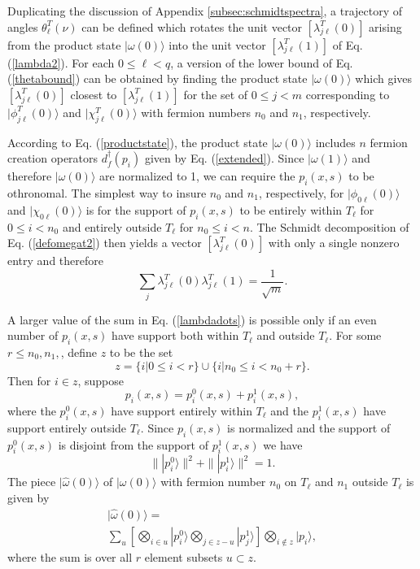 \documentclass[twocolumn,amsmath,amssymb]{revtex4-1}
\begin{document}
Duplicating the discussion of Appendix \ref{subsec:schmidtspectra}, a
trajectory of angles $\theta^T_\ell(\nu)$ can be defined which rotates
the unit vector $[ \lambda^T_{j\ell}(0) ]$ arising from the product
state $|\omega(0) \rangle $ into the unit vector $[\lambda^T_{j\ell}(1) ]$ of
Eq. (\ref{lambda2}). For each $0 \le \ell < q$, a version of
the lower bound of Eq. (\ref{thetabound}) can be obtained
by finding the product state $|\omega(0) \rangle $ which gives $[ \lambda^T_{j\ell}(0) ]$ 
closest to $[ \lambda^T_{j\ell}(1) ]$
for the set of $0 \le j < m$
corresponding to $|\phi^T_{j\ell}(0) \rangle $
and $|\chi^T_{j\ell}(0) \rangle $
with
fermion numbers $n_0$ and $n_1$, respectively.

According to Eq. (\ref{productstate}), the product state $|\omega(0) \rangle $ 
includes $n$ fermion creation operators
$ d^\dagger_f( p_i)$ given by
Eq. (\ref{extended}). Since $|\omega(1) \rangle $ and therefore $|\omega(0) \rangle $ are normalized
to 1, we can require the $p_i( x, s)$ 
to be othronomal.
The simplest way to insure $n_0$ and $n_1$, respectively,
for $|\phi_{0\ell}(0) \rangle $
and $|\chi_{0\ell}(0) \rangle $ is for the support of $p_i( x, s)$
to
be entirely within $T_\ell$ for $0 \le i < n_0$ and entirely
outside $T_\ell$ for $n_0 \le i < n$.
The Schmidt decomposition of Eq. (\ref{defomegat2}) then yields
a vector $[ \lambda^T_{j\ell}(0) ]$ with only a single nonzero
entry and therefore
\begin{equation}
  \label{lambdadots}
  \sum_j \lambda^T_{j \ell}(0) \lambda^T_{j \ell}(1) = \frac{1}{\sqrt{m}}.
\end{equation}


A larger value of the sum in Eq. (\ref{lambdadots}) is possible
only if an even number of $p_i(x,s)$ have support both within
$T_\ell$ and outside $T_\ell$.
For some $r \le n_0, n_1,$,
define $z$ to be the set
\begin{equation}
  \label{defsetz}
  z = \{ i | 0 \le i < r \} \cup  \{ i | n_0 \le i < n_0 + r \}.
\end{equation}
Then for $i \in z$, suppose
\begin{equation}
    \label{split0}
    p_i( x, s)  =  p^0_i( x, s) + p^1_i(x, s),
\end{equation}
where the $p^0_i( x, s)$ have support entirely within
$T_\ell$ and the $p^1_i( x, s)$ have support entirely
outside $T_\ell$. Since $p_i(x,s)$ is normalized and
the support of $p^0_i(x,s)$ is disjoint from
the support of $p^1_i(x,s)$ we have
\begin{equation}
  \label{splitnormalization}
  \parallel | p^0_i \rangle  \parallel^2 + \parallel | p^1_i \rangle  \parallel^2  = 1.
\end{equation}
The piece $|\hat{\omega}( 0) \rangle $  of $|\omega( 0) \rangle $ with fermion number
$n_0$ on $T_\ell$ and $n_1$ outside $T_\ell$ 
is given by
\begin{multline}
    \label{defpiecewithn0n1}
    |\hat{\omega}(0) \rangle  = \\
    \sum_u [\bigotimes_{i \in u} |p^0_i \rangle  \bigotimes_{ j \in z - u } |p^1_j \rangle  ]\bigotimes_{i \notin z} |p_i \rangle ,
\end{multline}
where the sum is over all $r$ element subsets $u \subset z$.
\end{document}
